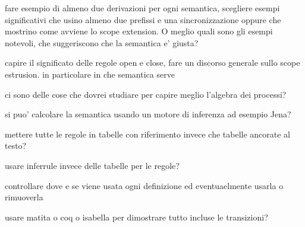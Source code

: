 
fare esempio di almeno due derivazioni per ogni semantica, scegliere esempi significativi che usino almeno due prefissi e una sincronizzazione oppure che mostrino come avviene lo scope extension.
O meglio quali sono gli esempi notevoli, che suggeriscono che la semantica e' giusta?

capire il significato delle regole open e close, fare un discorso generale sullo scope estrusion. in particolare in che semantica serve

ci sono delle cose che dovrei studiare per capire meglio l'algebra dei processi?

si puo' calcolare la semantica usando un motore di inferenza ad esempio Jena?

mettere tutte le regole in tabelle con riferimento invece che tabelle ancorate al testo?

usare inferrule invece delle tabelle per le regole?

controllare dove e se viene usata ogni definizione ed eventuaelmente usarla o rimuoverla

usare matita o coq o isabella per dimostrare tutto incluse le transizioni?

